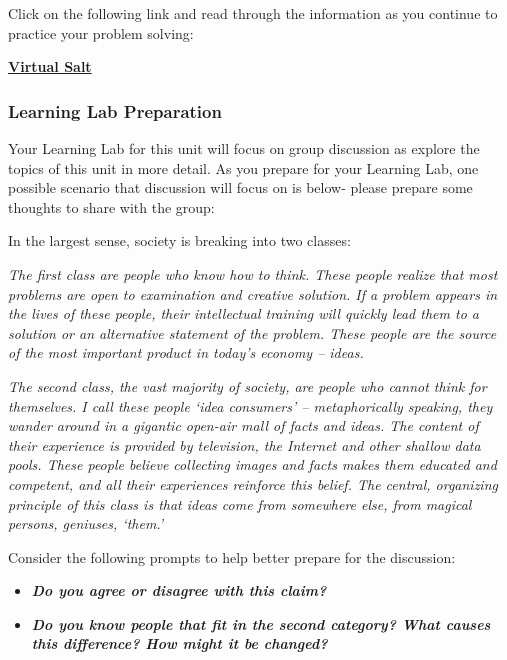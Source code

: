 \documentclass[
]{book}
\providecommand{\tightlist}{%
  \setlength{\itemsep}{0pt}\setlength{\parskip}{0pt}}
\begin{document}
\begin{reflect}
Click on the following link and read through the information as you continue to practice your problem solving:

\href{https://www.virtualsalt.com/crebook4.htm}{\textbf{Virtual Salt}}

\hypertarget{learning-lab-preparation}{%
\subsubsection*{Learning Lab Preparation}\label{learning-lab-preparation}}

Your Learning Lab for this unit will focus on group discussion as explore the topics of this unit in more detail. As you prepare for your Learning Lab, one possible scenario that discussion will focus on is below- please prepare some thoughts to share with the group:

In the largest sense, society is breaking into two classes:

\emph{The first class are people who know how to think. These people realize that most problems are open to examination and creative solution. If a problem appears in the lives of these people, their intellectual training will quickly lead them to a solution or an alternative statement of the problem. These people are the source of the most important product in today's economy -- ideas.}

\emph{The second class, the vast majority of society, are people who cannot think for themselves. I call these people `idea consumers' -- metaphorically speaking, they wander around in a gigantic open-air mall of facts and ideas. The content of their experience is provided by television, the Internet and other shallow data pools. These people believe collecting images and facts makes them educated and competent, and all their experiences reinforce this belief. The central, organizing principle of this class is that ideas come from somewhere else, from magical persons, geniuses, `them.'}

Consider the following prompts to help better prepare for the discussion:

\begin{itemize}
\tightlist
\item
  \textbf{\emph{Do you agree or disagree with this claim?}}\\
\item
  \textbf{\emph{Do you know people that fit in the second category? What causes this difference? How might it be changed?}}
\end{itemize}
\end{reflect}
\end{document}
